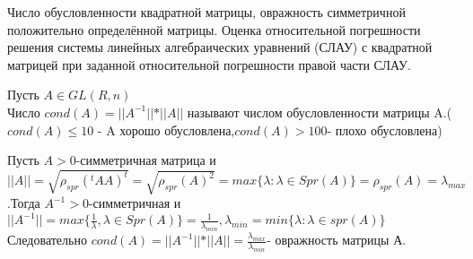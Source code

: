 \documentclass[__main__.tex]{subfiles}
\begin{document}
Число обусловленности квадратной матрицы, овражность симметричной положительно определённой матрицы. Оценка относительной погрешности решения системы линейных алгебраических уравнений (СЛАУ) с квадратной матрицей при заданной относительной погрешности правой части СЛАУ.

\begin{definition}
	Пусть $A\in GL(R,n)$\\
	Число $cond(A)=\vert\vert A^{-1} \vert\vert *\vert\vert A \vert\vert $ называют числом обусловленности матрицы A.($cond(A)\leq 10$ - A хорошо обусловлена,$cond(A)>100$- плохо обусловлена)\\
\end{definition}
	
\begin{definition}
	Пусть $A>0$-симметричная матрица и $\vert\vert A \vert\vert= \sqrt{\rho_{spr}(^tAA)^t}=\sqrt{\rho_{spr}(A)^2}=max\lbrace\lambda:\lambda\in Spr(A)\rbrace=\rho_{spr}(A)=\lambda_{max}$.Тогда $A^{-1}>0$-симметричная и $\vert\vert A^{-1} \vert\vert=max\lbrace\frac{1}{\lambda},\lambda \in Spr(A)\rbrace=\frac{1}{\lambda_{min}}, \lambda_{min}=min\lbrace\lambda:\lambda \in spr(A)\rbrace$\\
	Следовательно $cond(A)=\vert\vert A^{-1} \vert\vert *\vert\vert A \vert\vert=\frac{\lambda_{max}}{\lambda_{min}} $- овражность матрицы А.\\
\end{definition}
\end{document}
